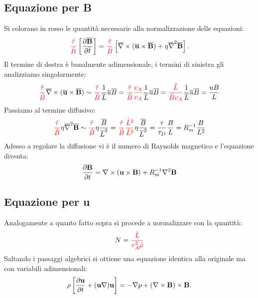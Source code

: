 \subsection{Equazione per B}
Si colorano in rosso le quantità necessarie alla normalizzazione delle equazioni:
\begin{equation}
    \textcolor{red}{\frac{\tilde{\tau}}{\tilde{B}}}
    \left[\pdx{\ov{\vv{B}}}{\ov{t}}\right]
    =
    \textcolor{red}{\frac{\tilde{\tau }}{\tilde{B }}}
    \left[ \ov{\nabla} \times (\ov{\vv{u}} \times \ov{\vv{B}}) + \eta \ov{\nabla}^2 \ov{\vv{B}} \right].
\end{equation}
Il termine di destra è banalmente adimensionale, i termini di sinistra gli analizziamo singolarmente:
\[
    \textcolor{red}{\frac{\tilde{\tau }}{\tilde{B }}}
    \ov{\nabla} \times (\ov{\vv{u}} \times \ov{\vv{B}})
    \sim
    \textcolor{red}{\frac{\tilde{\tau }}{\tilde{B }}}
    \frac{1}{\ov{L}} \ov{u} \ov{B}
    =
    \textcolor{red}{\frac{\tilde{\tau }}{\tilde{B }}
    \frac{v_A}{v_A}} \frac{1}{\ov{L}} \ov{u} \ov{B}
    =
    \textcolor{red}{\frac{\tilde{L}}{\tilde{B}v_A}}\frac{1}{\ov{L}} \ov{u} \ov{B}
    =
    \frac{uB}{L}
\]
Passiamo al termine diffusivo:
\[
    \textcolor{red}{\frac{\tilde{\tau }}{\tilde{B }}}
    \eta \ov{\nabla}^2 \ov{\vv{B}}
    \sim
    \textcolor{red}{\frac{\tilde{\tau }}{\tilde{B }}} \eta \frac{\ov{B}}{\ov{L}^2}
    =
    \textcolor{red}{\frac{\tilde{\tau }}{\tilde{B }} \frac{\tilde{L}^2}{\tilde{L}^2}} \eta \frac{\ov{B}}{\ov{L}^2}
    = \frac{\tau }{\tau_D } \frac{B}{L} = R_m^{-1} \frac{B}{L^2}
\]
Adesso a regolare la diffusione vi è il numero di Raynolds magnetico e l'equazione diventa:
\[
    \pd{\vv{B}} = \nabla \times (\vv{u} \times \vv{B}) + R_m^{-1} \nabla^2 \vv{B}
\]
\subsection{Equazione per u}
Analogamente a quanto fatto sopra si procede a normalizzare con la quantità:
\[
    N =  \textcolor{red}{\frac{\tilde{L}}{v_A^2 \tilde{\rho}}}
\]
Saltando i passaggi algebrici si ottiene una equazione identica alla originale ma con variabili adimensionali:
\[
    \rho \left[\pd{\vv{u}} + (\vv{u} \nabla)\vv{u}\right] = - \nabla p + (\nabla \times \vv{B} ) \times \vv{B}.
\]
